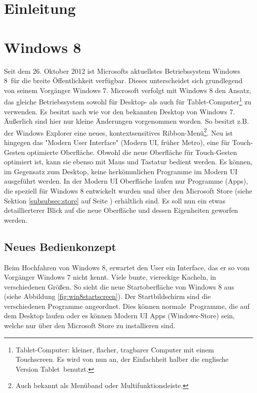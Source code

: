 \documentclass[12pt,a4paper]{scrartcl}
\author{Malte Modrow}
\begin{document}
\thispagestyle{plain}
\tableofcontents
\thispagestyle{plain}

\newpage
\section{Einleitung}
\label{sec:einleitung}
\newpage
\section{Windows 8}
\label{sec:windows8}
Seit dem 26. Oktober 2012 ist Microsofts aktuellstes Betriebssystem \glqq Windows 8\grqq\ für die breite Öffentlichkeit verfügbar. Dieses unterscheidet sich grundlegend von seinem Vorgänger \glqq Windows 7\grqq. Microsoft verfolgt mit Windows 8 den Ansatz, das gleiche Betriebssystem sowohl für Desktop- als auch für Tablet-Computer\footnote{Tablet-Computer: kleiner, flacher, tragbarer Computer mit einem Touchscreen. Es wird von nun an, der Einfachheit halber die englische Version \glqq Tablet\grqq\ benutzt.} zu verwenden. Es besitzt nach wie vor den bekannten Desktop von Windows 7. Äußerlich sind hier nur kleine Änderungen vorgenommen worden. So besitzt z.B. der Windows Explorer eine neues, kontextsensitives Ribbon-Menü\footnote{Auch bekannt als Menüband oder Multifunktionsleiste.}. Neu ist hingegen das "Modern User Interface" (Modern UI, früher Metro), eine für Touch-Gesten optimierte Oberfläche. Obwohl die neue Oberfläche für Touch-Gesten optimiert ist, kann sie ebenso mit Maus und Tastatur bedient werden. Es können, im Gegensatz zum Desktop, keine herkömmlichen Programme im Modern UI ausgeführt werden. In der Modern UI Oberfläche laufen nur Programme (Apps), die speziell für Windows 8 entwickelt wurden und über den Microsoft Store (siehe Sektion \ref{subsubsec:store} auf Seite \pageref{subsubsec:store}) erhältlich sind. Es soll nun ein etwas detaillierterer Blick auf die neue Oberfläche und dessen Eigenheiten geworfen werden.
\subsection{Neues Bedienkonzept}
\label{subsec:bedienkonzept}
Beim Hochfahren von Windows 8, erwartet den User ein Interface, das er so vom Vorgänger Windows 7 nicht kennt. Viele bunte, viereckige Kacheln, in verschiedenen Größen. So sieht die neue Startoberfläche von Windows 8 aus (siehe Abbildung \ref{fig:win8startscreen}). Der Startbildschirm sind die verschiedenen Programme angeordnet. Dies können \glqq normale\grqq\ Programme, die auf dem Desktop laufen oder es können Modern UI Apps (Windows-Store) sein, welche nur über den Microsoft Store zu installieren sind.   
\end{document}

